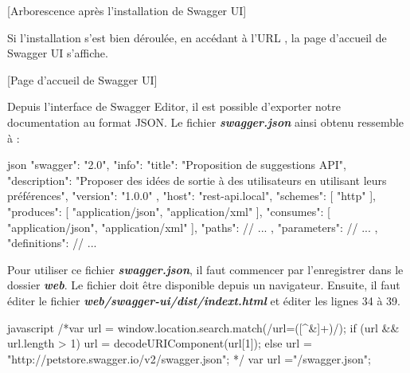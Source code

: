 \documentclass[big]{zmdocument}
\begin{document}
[Arborescence après l'installation de Swagger UI]


Si l'installation s'est bien déroulée, en accédant à l'URL , la page d'accueil de Swagger UI s'affiche.



[Page d'accueil de Swagger UI]




Depuis l'interface de Swagger Editor, il est possible d'exporter notre documentation au format JSON. Le fichier \textbf{\textit{swagger.json}} ainsi obtenu ressemble à :



\begin{CodeBlock}{json}
{
    "swagger": "2.0",
    "info": {
        "title": "Proposition de suggestions API",
        "description": "Proposer des idées de sortie à des utilisateurs en utilisant leurs préférences",
        "version": "1.0.0"
    },
    "host": "rest-api.local",
    "schemes": [
        "http"
    ],
    "produces": [
        "application/json",
        "application/xml"
    ],
    "consumes": [
        "application/json",
        "application/xml"
    ],
    "paths": {
        // ...
    },
    "parameters": {
         // ...
    },
    "definitions": {
         // ...
    }
}
\end{CodeBlock}



Pour utiliser ce fichier \textbf{\textit{swagger.json}}, il faut commencer par l'enregistrer dans le dossier \textbf{\textit{web}}. Le fichier doit être disponible depuis un navigateur.
Ensuite, il faut éditer le fichier \textbf{\textit{web/swagger-ui/dist/indext.html}} et éditer les lignes 34 à 39.



\begin{CodeBlock}{javascript}
 /*var url = window.location.search.match(/url=([^&]+)/);
  if (url && url.length > 1) {
    url = decodeURIComponent(url[1]);
  } else {
    url = "http://petstore.swagger.io/v2/swagger.json";
  }*/
var url ="/swagger.json";
\end{CodeBlock}
\end{document}
